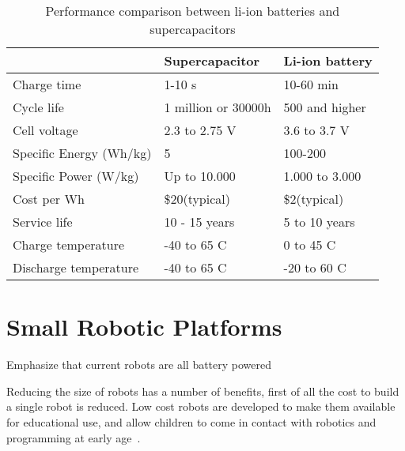 \begin{table}[t]
	\centering
	\begin{threeparttable}
		\caption{Performance comparison between li-ion batteries and supercapacitors}
		\label{tab:battery_vs_supercap}
		\small
		\begin{tabular}{|l|l|l|}
			\hline
			& Supercapacitor & Li-ion battery \\
			\hline \hline
			Charge time & 1-10 s & 10-60 min \\
			Cycle life & 1 million or 30000h & 500 and higher \\
			Cell voltage & 2.3 to 2.75 V & 3.6 to 3.7 V \\
			Specific Energy (Wh/kg) & 5 & 100-200 \\
			Specific Power (W/kg) & Up to 10.000 & 1.000 to 3.000 \\
			Cost per Wh & \$20(typical) & \$2(typical) \\
			Service life & 10 - 15 years & 5 to 10 years \\
			Charge temperature & -40 to 65 \textdegree C & 0 to 45 \textdegree C \\
			Discharge temperature & -40 to 65 \textdegree C & -20 to 60 \textdegree C \\
			\hline
		\end{tabular}
	\end{threeparttable}
\end{table}


\section{Small Robotic Platforms}
\label{sec:robotic_platforms}



Emphasize that current robots are all battery powered

Reducing the size of robots has a number of benefits, first of all the cost to build a single robot is reduced.
Low cost robots are developed to make them available for educational use, and allow children to come in contact with robotics and programming at early age~\cite{rubenstein_icra_2015}.


